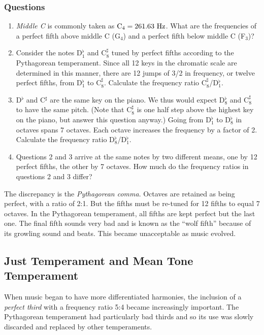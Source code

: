 \documentclass[11pt]{NSF}
\def\ben{\begin{enumerate}}
\def\een{\end{enumerate}}
\begin{document}
\subsubsection*{Questions}
\ben
\item
{\em Middle C} is commonly taken as ${\rm C}_4 = 261.63~{\rm Hz}$. 
What are the frequencies of a perfect fifth above middle C (G$_4$) 
and a perfect fifth below middle C (F$_3$)?

\item
Consider the notes D$^\flat_1$ and C$^\sharp_8$ tuned by perfect 
fifths according to the Pythagorean temperament. 
Since all 12 keys in the chromatic scale are
determined in this manner, there are 12 jumps of 3/2 in frequency, or
twelve perfect fifths, from D$^\flat_1$ to C$^\sharp_8$. 
Calculate the frequency ratio C$^\sharp_8$/D$^\flat_1$.

\item 
D$^\flat$ and C$^\sharp$ are the same key on the piano. 
We thus would expect D$^\flat_8$ and
C$^\sharp_8$ to have the same pitch. 
(Note that C$^\sharp_8$ is one half step above the
highest key on the piano, but answer this question anyway.) 
Going from D$^\flat_1$ to D$^\flat_8$ in octaves spans 7 octaves. 
Each octave increases the frequency by a factor of 2. 
Calculate the frequency ratio D$^\flat_8$/D$^\flat_1$.

\item
Questions 2 and 3 arrive at the same notes by two different means, one
by 12 perfect fifths, the other by 7 octaves. 
How much do the frequency ratios in questions 2 and 3 differ?  
\een

The discrepancy is the {\em Pythagorean comma}. 
Octaves are retained as being perfect, with a ratio of 2:1. 
But the fifths must be re-tuned for 12 fifths to equal 7 octaves. 
In the Pythagorean temperament, all fifths are kept perfect but the last one. 
The final fifth sounds very bad and is known as the “wolf fifth” 
because of its growling sound and beats. 
This became unacceptable as music evolved.

\subsection{Just Temperament and Mean Tone Temperament}

When music began to have more differentiated harmonies, the inclusion
of a {\em perfect third} with a frequency ratio 5:4 became increasingly
important. The Pythagorean temperament had particularly bad thirds and
so its use was slowly discarded and replaced by other temperaments.
\end{document}
